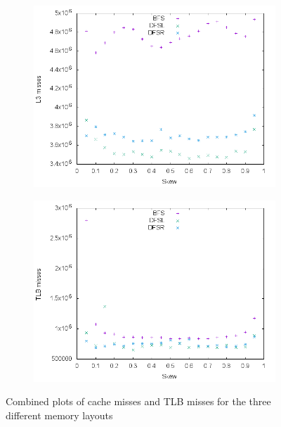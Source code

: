 \documentclass{article}
\begin{document}
\begin{figure}[H]
\begin{subfigure}[b]{0.49\textwidth}
		\includegraphics[width=\textwidth]{figures/combined_L3}	
	\end{subfigure}
	\begin{subfigure}[b]{0.49\textwidth}
		\includegraphics[width=\textwidth]{figures/combined_TLB}	
	\end{subfigure}
	\caption{Combined plots of cache misses and TLB misses for the three different memory layouts}
	\label{fig:combined_misses}
\end{figure}
\end{document}
